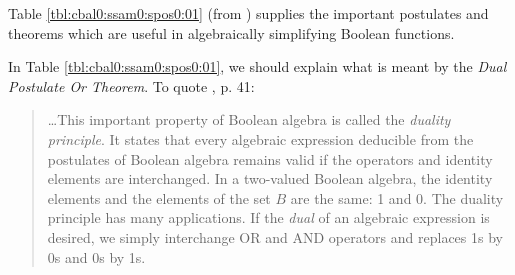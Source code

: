 Table \ref{tbl:cbal0:ssam0:spos0:01} 
(from \cite{bibref:b:manodigitaldesignseconded}) 
supplies the important postulates and theorems which are useful in
algebraically simplifying Boolean functions.

In Table \ref{tbl:cbal0:ssam0:spos0:01}, we should explain what 
is meant by the \emph{Dual Postulate Or Theorem}.  To
quote \cite{bibref:b:manodigitaldesignseconded}, p. 41:

\begin{quote}
\ldots This important property of Boolean algebra is called
the %
\emph{duality principle}.
It states that every algebraic expression deducible from the postulates
of Boolean algebra remains valid if the operators and identity
elements are interchanged.  In a two-valued Boolean algebra,
the identity elements and the elements of the set $B$ are the
same:  1 and 0.  The duality principle has many applications.
If the \emph{dual} of an algebraic expression is desired, we
simply interchange OR and AND operators and replaces 1s by
0s and 0s by 1s.
\end{quote}

